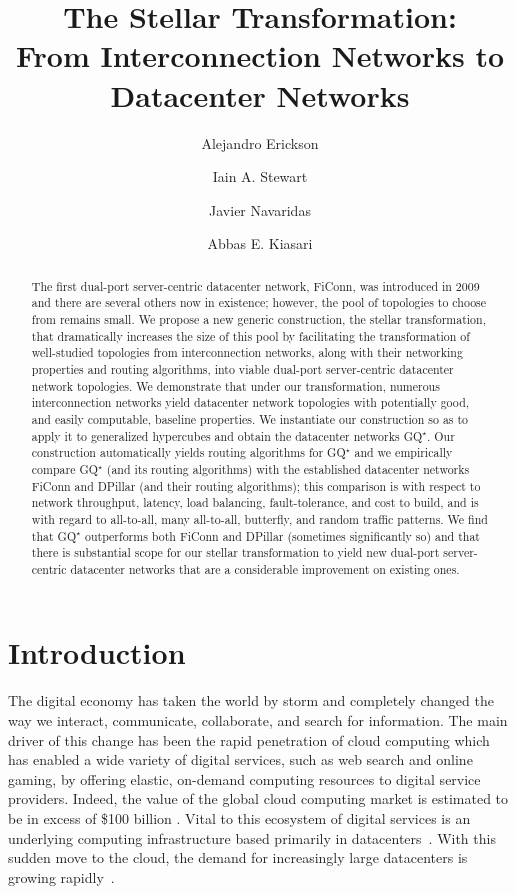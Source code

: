 \documentclass[]{amsart}
\title{The Stellar Transformation:\\ From Interconnection Networks to
  Datacenter Networks}
\author{Alejandro Erickson}
\author{Iain A. Stewart}
\author{Javier Navaridas}
\author{Abbas E. Kiasari}
\begin{document}
\maketitle

\begin{abstract}
The first dual-port server-centric datacenter network, FiConn, was introduced in 2009 and there are several others now in existence; however, the pool of topologies to choose from remains small.  We propose a new generic construction, the stellar transformation, that dramatically increases the size of this pool by facilitating the transformation of well-studied topologies from interconnection networks, along with their networking properties and routing algorithms, into viable dual-port server-centric datacenter network topologies.  We demonstrate that under our transformation, numerous interconnection networks yield datacenter network topologies with potentially good, and easily computable, baseline  properties. We instantiate our construction so as to apply it to generalized hypercubes and obtain the datacenter networks GQ$^\star$.  Our construction automatically yields routing algorithms for GQ$^\star$ and we empirically compare GQ$^\star$ (and its routing algorithms) with the established datacenter networks FiConn and DPillar (and their routing algorithms); this comparison is with respect to network throughput, latency, load balancing, fault-tolerance, and cost to build, and is with regard to all-to-all, many all-to-all, butterfly, and random traffic patterns.  We find that GQ$^\star$ outperforms both FiConn and DPillar (sometimes significantly so) and that there is substantial scope for our stellar transformation to yield new dual-port server-centric datacenter networks that are a considerable improvement on existing ones.
\end{abstract}



\section{Introduction}\label{sec:introduction}

The digital economy has taken the world by storm and completely
changed the way we interact, communicate, collaborate, and search for information.  The main driver of this change has been the rapid
penetration of cloud computing which has enabled a wide variety of
digital services, such as web search and online gaming, by offering
elastic, on-demand computing resources to digital service providers.
Indeed, the value of the global cloud computing market is estimated to be in excess of \$100 billion \cite{WuBuyya2012}.  Vital to this ecosystem of digital services is an underlying computing infrastructure based primarily in datacenters~\cite{ArmbrustFoxGriffith2010}.  With this sudden move to the cloud, the demand for increasingly large datacenters is growing rapidly~\cite{GuoWuTan2008}.
\end{document}
